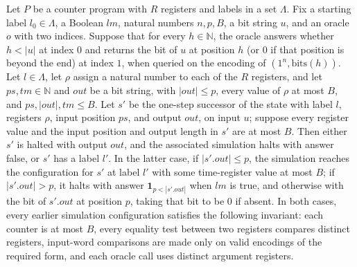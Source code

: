 \begin{lemma}
\label{Complexity.CPSim.sim_step}
\leanok
{}
Let $P$ be a counter program with $R$ registers and labels in a set $\Lambda$. Fix a
starting label $l_0\in\Lambda$, a Boolean $lm$, natural numbers $n,p,B$, a bit string
$u$, and an oracle $o$ with two indices. Suppose that for every $h\in\mathbb N$, the
oracle answers whether $h<|u|$ at index $0$ and returns the bit of $u$ at position $h$
(or $0$ if that position is beyond the end) at index $1$, when queried on the encoding
of $(1^n,\mathrm{bits}(h))$. Let $l\in\Lambda$, let $\rho$ assign a natural number to
each of the $R$ registers, and let $ps,tm\in\mathbb N$ and $out$ be a bit string, with
$|out|\le p$, every value of $\rho$ at most $B$, and $ps,|out|,tm\le B$. Let $s'$ be the
one-step successor of the state with label $l$, registers $\rho$, input position $ps$,
and output $out$, on input $u$; suppose every register value and the input position and
output length in $s'$ are at most $B$. Then either $s'$ is halted with output $out$, and
the associated simulation halts with answer false, or $s'$ has a label $l'$. In the
latter case, if $|s'.out|\le p$, the simulation reaches the configuration for $s'$ at
label $l'$ with some time-register value at most $B$; if $|s'.out|>p$, it halts with
answer $\mathbf{1}_{p<|s'.out|}$ when $lm$ is true, and otherwise with the bit of
$s'.out$ at position $p$, taking that bit to be $0$ if absent. In both cases, every
earlier simulation configuration satisfies the following invariant: each counter is at
most $B$, every equality test between two registers compares distinct registers,
input-word comparisons are made only on valid encodings of the required form, and each
oracle call uses distinct argument registers.
\end{lemma}
